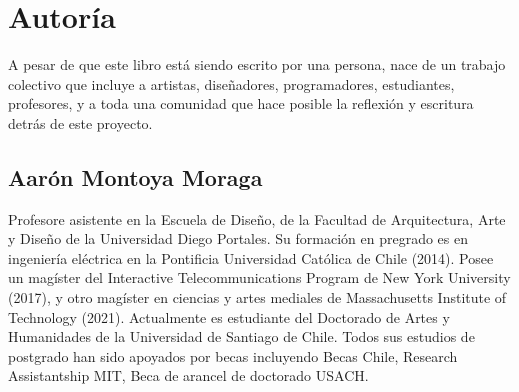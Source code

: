 \documentclass[../principal.tex]{subfiles}
\begin{document}
\chapter{Autoría}

A pesar de que este libro está siendo escrito por una persona, nace de un trabajo colectivo que incluye a artistas, diseñadores, programadores, estudiantes, profesores, y a toda una comunidad que hace posible la reflexión y escritura detrás de este proyecto.

\section{Aarón Montoya Moraga}

Profesore asistente en la Escuela de Diseño, de la Facultad de Arquitectura, Arte y Diseño de la Universidad Diego Portales. Su formación en pregrado es en ingeniería eléctrica en la Pontificia Universidad Católica de Chile (2014). Posee un magíster del Interactive Telecommunications Program de New York University (2017), y otro magíster en ciencias y artes mediales de Massachusetts Institute of Technology (2021). Actualmente es estudiante del Doctorado de Artes y Humanidades de la Universidad de Santiago de Chile. Todos sus estudios de postgrado han sido apoyados por becas incluyendo Becas Chile, Research Assistantship MIT, Beca de arancel de doctorado USACH.

\newpage
\end{document}
